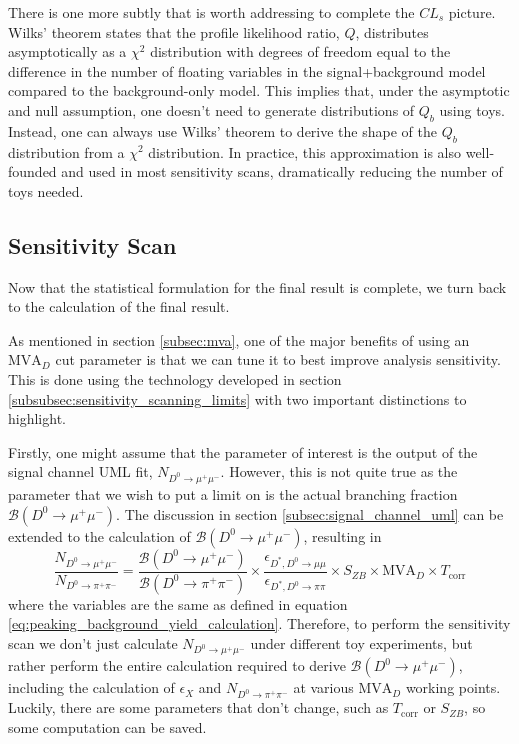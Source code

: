 There is one more subtly that is worth addressing to complete the $CL_s$ picture. Wilks' theorem states that the profile likelihood ratio, $Q$, distributes asymptotically as a $\chi^2$ distribution with degrees of freedom equal to the difference in the number of floating variables in the signal+background model compared to the background-only model. This implies that, under the asymptotic and null assumption, one doesn't need to generate distributions of $Q_b$ using toys. Instead, one can always use Wilks' theorem to derive the shape of the $Q_b$ distribution from a $\chi^2$ distribution. In practice, this approximation is also well-founded and used in most sensitivity scans, dramatically reducing the number of toys needed. 

\subsection{Sensitivity Scan}
\label{subsec:sensitivity_scan}

Now that the statistical formulation for the final result is complete, we turn back to the calculation of the final result. 

As mentioned in section \ref{subsec:mva}, one of the major benefits of using an $\text{MVA}_D$ cut parameter is that we can tune it to best improve analysis sensitivity. This is done using the technology developed in section \ref{subsubsec:sensitivity_scanning_limits} with two important distinctions to highlight.

Firstly, one might assume that the parameter of interest is the output of the signal channel UML fit, $N_{D^0 \to \mu^+ \mu^-}$. However, this is not quite true as the parameter that we wish to put a limit on is the actual branching fraction $\mathcal{B}(D^0 \to \mu^+ \mu^-)$. The discussion in section \ref{subsec:signal_channel_uml} can be extended to the calculation of $\mathcal{B}(D^0 \to \mu^+ \mu^-)$, resulting in 
\begin{equation}
    \frac{N_{D^0 \to \mu^+  \mu^-}}{N_{D^0 \to \pi^+ \pi^-}} = \frac{\mathcal{B}(D^0 \to \mu^+ \mu^-)}{\mathcal{B}(D^0 \to \pi^+ \pi^-)}\times \frac{\epsilon_{D^*, D^0\to\mu\mu}}{\epsilon_{D^*, D^0\to\pi\pi}} \times S_{ZB} \times \text{MVA}_D \times T_{\text{corr}} 
\end{equation}
where the variables are the same as defined in equation \ref{eq:peaking_background_yield_calculation}. Therefore, to perform the sensitivity scan we don't just calculate $N_{D^0 \to \mu^+ \mu^-}$ under different toy experiments, but rather perform the entire calculation required to derive $\mathcal{B}(D^0 \to \mu^+ \mu^-)$, including the calculation of $\epsilon_X$ and $N_{D^0 \to \pi^+ \pi^-}$ at various $\text{MVA}_D$ working points. Luckily, there are some parameters that don't change, such as $T_{\text{corr}}$ or $S_{ZB}$, so some computation can be saved.

